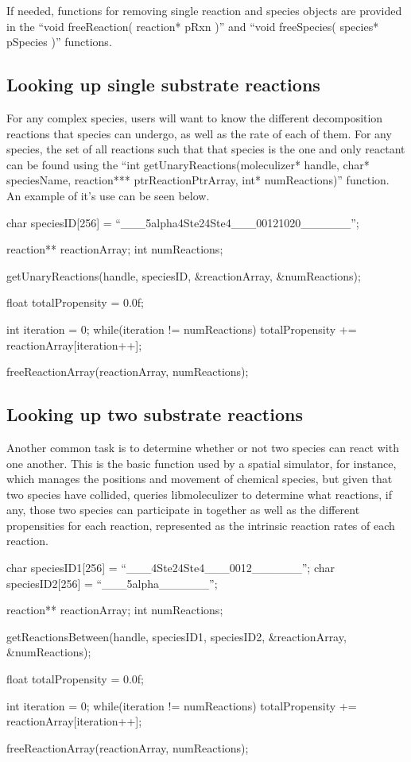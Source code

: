 If needed, functions for removing single reaction and species objects
are provided in the ``void freeReaction( reaction* pRxn )'' and ``void
freeSpecies( species* pSpecies )'' functions.

\subsection{Looking up single substrate reactions}
For any complex species, users will want to know the different
decomposition reactions that species can undergo, as well as the rate
of each of them.  For any species, the set of all reactions such that
that species is the one and only reactant can be found using the ``int
getUnaryReactions(moleculizer* handle, char* speciesName, reaction***
ptrReactionPtrArray, int* numReactions)'' function.  An example of
it's use can be seen below.

\begin{ExampleC}
  char speciesID[256] = ``___5alpha4Ste24Ste4___00121020______'';
  
  reaction** reactionArray;
  int numReactions;

  getUnaryReactions(handle, speciesID, &reactionArray, &numReactions);

  float totalPropensity = 0.0f;

  int iteration = 0;
  while(iteration != numReactions)
  {
    totalPropensity += reactionArray[iteration++];
  }

  freeReactionArray(reactionArray, numReactions);

\end{ExampleC}

\subsection{Looking up two substrate reactions}
Another common task is to determine whether or not two species can
react with one another.  This is the basic function used by a spatial
simulator, for instance, which manages the positions and movement of
chemical species, but given that two species have collided, queries
libmoleculizer to determine what reactions, if any, those two species
can participate in together as well as the different propensities for
each reaction, represented as the intrinsic reaction rates of each
reaction.  

\begin{ExampleC}
  char speciesID1[256] = ``___4Ste24Ste4___0012______'';
  char speciesID2[256] = ``___5alpha______'';
  
  reaction** reactionArray;
  int numReactions;

  getReactionsBetween(handle, speciesID1, speciesID2, &reactionArray, &numReactions);

  float totalPropensity = 0.0f;

  int iteration = 0;
  while(iteration != numReactions)
  {
    totalPropensity += reactionArray[iteration++];
  }

  freeReactionArray(reactionArray, numReactions);

\end{ExampleC}


